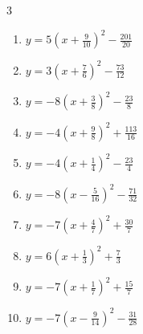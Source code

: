 \begin{multicols}{3}
\begin{enumerate}
  \item $\displaystyle y=5\left( x+\frac{9}{10}\right)^{2}-\frac{201}{20}$


  \item $\displaystyle y=3\left( x+\frac{7}{6}\right)^{2}-\frac{73}{12}$


  \item $\displaystyle y=-8\left( x+\frac{3}{8}\right)^{2}-\frac{23}{8}$


  \item $\displaystyle y=-4\left( x+\frac{9}{8}\right)^{2}+\frac{113}{16}$


\columnbreak %

  \item $\displaystyle y=-4\left( x+\frac{1}{4}\right)^{2}-\frac{23}{4}$


  \item $\displaystyle y=-8\left( x-\frac{5}{16}\right)^{2}-\frac{71}{32}$


  \item $\displaystyle y=-7\left( x+\frac{4}{7}\right)^{2}+\frac{30}{7}$


  \item $\displaystyle y=6\left( x+\frac{1}{3}\right)^{2}+\frac{7}{3}$


  \item $\displaystyle y=-7\left( x+\frac{1}{7}\right)^{2}+\frac{15}{7}$


  \item $\displaystyle y=-7\left( x-\frac{9}{14}\right)^{2}-\frac{31}{28}$


\end{enumerate}
\end{multicols}
